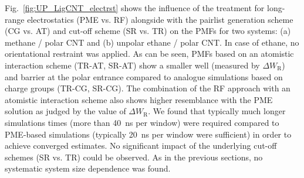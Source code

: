 \documentclass[9pt,lessons]{livecoms}
\begin{document}
Fig.~\ref{fig:UP_LigCNT_electrst} shows the influence of the treatment for long-range electrostatics (PME vs. RF) 
alongside with the pairlist generation scheme (CG vs. AT) and cut-off scheme (SR vs. TR) on the PMFs for two systems: (a) methane / polar CNT and (b) unpolar ethane / polar CNT. 
In case of ethane, no orientational restraint was applied. 
As can be seen, PMFs based on an atomistic interaction scheme (TR-AT, SR-AT) show a smaller well (measured by $\Delta W_\mathrm{R}$) and barrier at the polar entrance 
compared to analogue simulations based on charge groups (TR-CG, SR-CG).
The combination of the RF approach with an atomistic interaction scheme also shows higher resemblance with the PME solution as judged by the value of $\Delta W_\mathrm{R}$.
We found that typically much longer simulations times (more than 40~ns per window) were required compared to PME-based simulations (typically 20~ns per window were sufficient) in order to achieve converged estimates. 
No significant impact of the underlying cut-off schemes (SR vs. TR) could be observed.
As in the previous sections, no systematic system size dependence was found.
\end{document}
